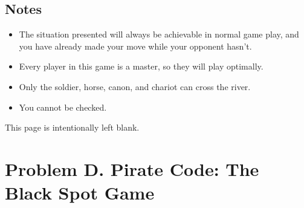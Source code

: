 \documentclass[12pt,a4paper]{article}
\newcommand*{\blankpage}{%
\newpage
\vspace*{\fill}
{\centering \huge This page is intentionally left blank.\par}
\vspace{\fill}
\newpage}
\begin{document}
\subsection*{\fontsize{16}{12}Notes}
\begin{itemize}
\item The situation presented will always be achievable in normal game play, and you have already made your move while your opponent hasn't.
\item Every player in this game is a master, so they will play optimally.
\item Only the soldier, horse, canon, and chariot can cross the river.
\item You cannot be checked.
\end{itemize}

\blankpage

\section*{\fontsize{18}{12}Problem D. Pirate Code: The Black Spot Game}
\end{document}
